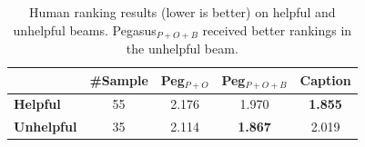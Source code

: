 \begin{table}[]
\centering \small

\addtolength{\tabcolsep}{-1mm}
\begin{tabular}{@{}lcccc@{}}
    \toprule
     & \textbf{\#Sample} & \textbf{Peg}$_{P+O}$ & \textbf{Peg}$_{P+O+B}$ & \textbf{Caption} \\ \midrule
    \textbf{Helpful} & 55 & 2.176 & 1.970 & \textbf{1.855} \\
    \textbf{Unhelpful} & 35 & 2.114 & \textbf{1.867} & 2.019 \\ 
    \bottomrule
\end{tabular}
\addtolength{\tabcolsep}{+1mm}
\vspace{-1mm}
\caption{Human ranking results (lower is better) on helpful and unhelpful beams. Pegasus$_{P+O+B}$ received better rankings in the unhelpful beam.}
\label{tab:human-eval-quality-beam}
\vspace{-5mm}
\end{table}